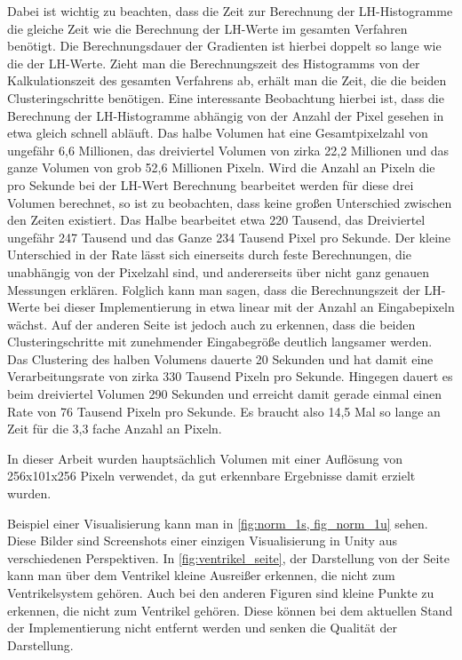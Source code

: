 Dabei ist wichtig zu beachten, dass die Zeit zur Berechnung der LH-Histogramme die gleiche Zeit wie die Berechnung der LH-Werte im gesamten Verfahren benötigt. Die Berechnungsdauer der Gradienten ist hierbei doppelt so lange wie die der LH-Werte. Zieht man die Berechnungszeit des Histogramms von der Kalkulationszeit des gesamten Verfahrens ab, erhält man die Zeit, die die beiden Clusteringschritte benötigen.
\newline
Eine interessante Beobachtung hierbei ist, dass die Berechnung der LH-Histogramme abhängig von der Anzahl der Pixel gesehen in etwa gleich schnell abläuft. Das halbe Volumen hat eine Gesamtpixelzahl von ungefähr 6,6 Millionen, das dreiviertel Volumen von zirka 22,2 Millionen und das ganze Volumen von grob 52,6 Millionen Pixeln. Wird die Anzahl an Pixeln die pro Sekunde bei der LH-Wert Berechnung bearbeitet werden für diese drei Volumen berechnet, so ist zu beobachten, dass keine großen Unterschied zwischen den Zeiten existiert. Das Halbe bearbeitet etwa 220 Tausend, das Dreiviertel ungefähr 247 Tausend und das Ganze 234 Tausend Pixel pro Sekunde. Der kleine Unterschied in der Rate lässt sich einerseits durch feste Berechnungen, die unabhängig von der Pixelzahl sind, und andererseits über nicht ganz genauen Messungen erklären. Folglich kann man sagen, dass die Berechnungszeit der LH-Werte bei dieser Implementierung in etwa linear mit der Anzahl an Eingabepixeln wächst.
\newline
Auf der anderen Seite ist jedoch auch zu erkennen, dass die beiden Clusteringschritte mit zunehmender Eingabegröße deutlich langsamer werden. Das Clustering des halben Volumens dauerte 20 Sekunden und hat damit eine Verarbeitungsrate von zirka 330 Tausend Pixeln pro Sekunde. Hingegen dauert es beim dreiviertel Volumen 290 Sekunden und erreicht damit gerade einmal einen Rate von 76 Tausend Pixeln pro Sekunde. Es braucht also 14,5 Mal so lange an Zeit für die 3,3 fache Anzahl an Pixeln.





 In dieser Arbeit wurden hauptsächlich Volumen mit einer Auflösung von 256x101x256 Pixeln verwendet, da gut erkennbare Ergebnisse damit erzielt wurden.

Beispiel einer Visualisierung kann man in \autoref{fig:norm_1s, fig_norm_1u} sehen. Diese Bilder sind Screenshots einer einzigen Visualisierung in Unity aus verschiedenen Perspektiven. In \autoref{fig:ventrikel_seite}, der Darstellung von der Seite kann man über dem Ventrikel kleine Ausreißer erkennen, die nicht zum Ventrikelsystem gehören. Auch bei den anderen Figuren sind kleine Punkte zu erkennen, die nicht zum Ventrikel gehören. Diese können bei dem aktuellen Stand der Implementierung nicht entfernt werden und senken die Qualität der Darstellung. 




